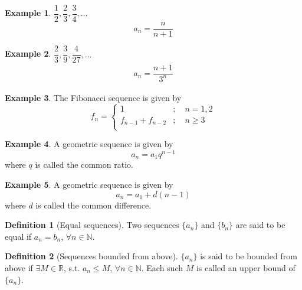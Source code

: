 \documentclass[fleqn, a4paper, 12pt, twoside]{article}
\theoremstyle{definition}
\newtheorem{example}{Example}
\newtheorem{definition}{Definition}
\theoremstyle{theorem}
\begin{document}
{\begin{example}
	$\dfrac{1}{2}, \dfrac{2}{3}, \dfrac{3}{4}, \dots$
	\begin{equation*}
		a_n = \dfrac{n}{n + 1}
	\end{equation*}
\end{example}

\begin{example}
	$\dfrac{2}{3}, \dfrac{3}{9}, \dfrac{4}{27}, \dots$
	\begin{align*}
		a_n = \dfrac{n + 1}{3^n}
	\end{align*}
\end{example}

\begin{example}
	The Fibonacci sequence is given by
	\begin{equation*}
		f_n =
			\begin{cases}
				1 &;\quad n = 1, 2\\
				f_{n - 1} + f_{n - 2} &;\quad n \geq 3\\
			\end{cases}
	\end{equation*}
\end{example}

\begin{example}
	A geometric sequence is given by
	\begin{equation*}
		a_n = a_1 q^{n - 1}
	\end{equation*}
	where $q$ is called the common ratio.
\end{example}

\begin{example}
	A geometric sequence is given by
	\begin{equation*}
		a_n = a_1 + d(n - 1)
	\end{equation*}
	where $d$ is called the common difference.
\end{example}

\begin{definition}[Equal sequences]
	Two sequences $\{a_n\}$ and $\{b_n\}$ are said to be equal if $a_n = b_n$, $\forall n \in \mathbb{N}$.
\end{definition}

\begin{definition}[Sequences bounded from above]
	$\{a_n\}$ is said to be bounded from above if $\exists M \in \mathbb{R}$, s.t. $a_n \leq M$, $\forall n \in \mathbb{N}$.
	Each such $M$ is called an upper bound of $\{a_n\}$.
\end{definition}

}
\end{document}
